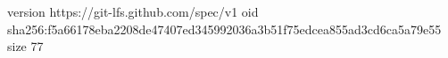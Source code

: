 version https://git-lfs.github.com/spec/v1
oid sha256:f5a66178eba2208de47407ed345992036a3b51f75edcea855ad3cd6ca5a79e55
size 77
